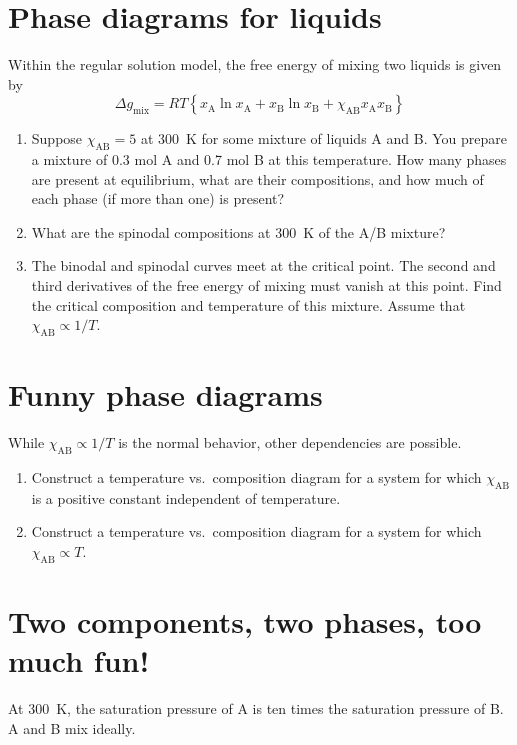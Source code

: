 \documentclass[11pt]{article}
\begin{document}
\section{Phase diagrams for liquids \label{Cp}}
\label{sec:orgf485388}
Within the regular solution model, the free  energy of mixing two liquids is given by
\begin{equation*}
  \Delta g_\text{mix} = RT \left \{ x_\text{A} \ln x_\text{A} +  x_\text{B} \ln
    x_\text{B} +\chi_\text{AB} x_\text{A}x_\text{B} \right \}
\end{equation*}
\begin{enumerate}
\item Suppose \(\chi_\text{AB} = 5\) at 300~K for some mixture of liquids A and B.  You prepare a mixture of 0.3 mol A and 0.7 mol B at this temperature.  How many phases are
present at equilibrium, what are their compositions, and how much of each phase (if more
than one) is present?

\item What are the spinodal compositions at 300~K of the A/B mixture?

\item The binodal and spinodal curves meet at the critical point.  The second and third
derivatives of the free energy of mixing must vanish at this point.  Find the critical
composition and temperature of this mixture.  Assume that \(\chi_\text{AB} \propto 1/T\).
\end{enumerate}

\section{Funny phase diagrams}
\label{sec:orge19bc5c}
While \(\chi_\text{AB} \propto 1/T\) is the normal behavior, other dependencies are possible.

\begin{enumerate}
\item Construct a temperature vs.~composition diagram for a system for which
\(\chi_\text{AB}\) is a positive constant independent of temperature.

\item Construct a temperature vs.~composition diagram for a system for which
\(\chi_\text{AB} \propto T\).
\end{enumerate}

\section{Two components, two phases, too much fun!}
\label{sec:org78d6e3b}
At \SI{300}{K}, the saturation pressure of A is ten times the saturation pressure of B. A and B mix ideally.
\end{document}
